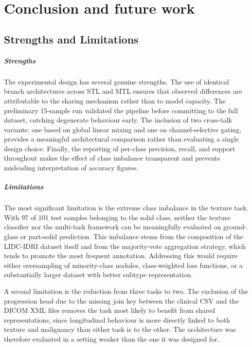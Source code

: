 \chapter{Conclusion and future work}
\label{chapter:concl}

\section{Strengths and Limitations}

\paragraph{Strengths}
The experimental design has several genuine strengths. The use of identical branch architectures across STL and MTL ensures that observed differences are attributable to the sharing mechanism rather than to model capacity. The preliminary 15-sample run validated the pipeline before committing to the full dataset, catching degenerate behaviour early. The inclusion of two cross-talk variants: one based on global linear mixing and one on channel-selective gating, provides a meaningful architectural comparison rather than evaluating a single design choice. Finally, the reporting of per-class precision, recall, and support throughout makes the effect of class imbalance transparent and prevents misleading interpretation of accuracy figures.

\paragraph{Limitations}
The most significant limitation is the extreme class imbalance in the texture task. With 97 of 101 test samples belonging to the solid class, neither the texture classifier nor the multi-task framework can be meaningfully evaluated on ground-glass or part-solid prediction. This imbalance stems from the composition of the LIDC-IDRI dataset itself and from the majority-vote aggregation strategy, which tends to promote the most frequent annotation. Addressing this would require either oversampling of minority-class nodules, class-weighted loss functions, or a substantially larger dataset with better subtype representation.

A second limitation is the reduction from three tasks to two. The exclusion of the progression head due to the missing join key between the clinical CSV and the DICOM XML files removes the task most likely to benefit from shared representations, since longitudinal behaviour is more directly linked to both texture and malignancy than either task is to the other. The architecture was therefore evaluated in a setting weaker than the one it was designed for.

